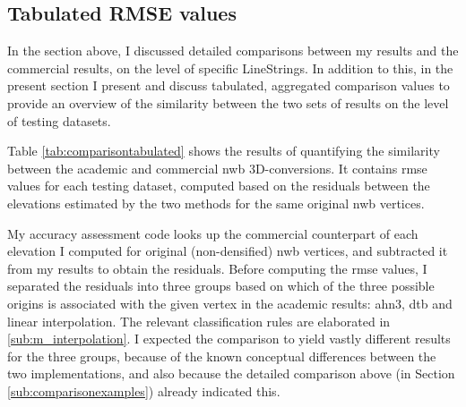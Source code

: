 \subsection{Tabulated RMSE values}
\label{sub:comparisontabulated}

In the section above, I discussed detailed comparisons between my results and the commercial results, on the level of specific LineStrings. In addition to this, in the present section I present and discuss tabulated, aggregated comparison values to provide an overview of the similarity between the two sets of results on the level of testing datasets.

Table \ref{tab:comparisontabulated} shows the results of quantifying the similarity between the academic and commercial \ac{nwb} 3D-conversions. It contains \ac{rmse} values for each testing dataset, computed based on the residuals between the elevations estimated by the two methods for the same original \ac{nwb} vertices.

\begin{table}[h]
    \caption[Tabulated academic and commercial similarity quantification results]{Tabulated academic and commercial RMSE-based similarity quantification results.}
    \label{tab:comparisontabulated}
\end{table}

My accuracy assessment code looks up the commercial counterpart of each elevation I computed for original (non-densified) \ac{nwb} vertices, and subtracted it from my results to obtain the residuals. Before computing the \ac{rmse} values, I separated the residuals into three groups based on which of the three possible origins is associated with the given vertex in the academic results: \ac{ahn3}, \ac{dtb} and linear interpolation. The relevant classification rules are elaborated in \ref{sub:m_interpolation}. I expected the comparison to yield vastly different results for the three groups, because of the known conceptual differences between the two implementations, and also because the detailed comparison above (in Section \ref{sub:comparisonexamples}) already indicated this.

